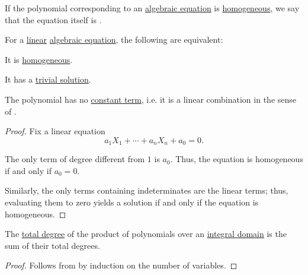 \begin{definition}\label{def:homogeneous_equation}\mimprovised
  If the polynomial corresponding to an \hyperref[def:algebraic_equation]{algebraic equation} is \hyperref[def:homogeneous_polynomial]{homogeneous}, we say that the equation itself is .
\end{definition}

\begin{proposition}\label{thm:homogeneous_linear_equation}
  For a \hyperref[def:polynomial_degree_terminology]{linear} \hyperref[def:algebraic_equation]{algebraic equation}, the following are equivalent:
  \begin{thmenum}
     It is \hyperref[def:homogeneous_equation]{homogeneous}.

     It has a \hyperref[def:trivial_solution_of_algebraic_equation]{trivial solution}.

     The polynomial has no \hyperref[def:univariate_polynomial]{constant term}, i.e. it is a linear combination in the sense of .
  \end{thmenum}
\end{proposition}
\begin{proof}
  Fix a linear equation
  \begin{equation*}
    a_1 X_1 + \cdots + a_n X_n + a_0 = 0.
  \end{equation*}

  The only term of degree different from \( 1 \) is \( a_0 \). Thus, the equation is homogeneous if and only if \( a_0 = 0 \).

  Similarly, the only terms containing indeterminates are the linear terms; thus, evaluating them to zero yields a solution if and only if the equation is homogeneous.
\end{proof}

\begin{proposition}\label{thm:degree_of_multivariate_polynomial_product}
  The \hyperref[def:polynomial_degree]{total degree} of the product of polynomials over an \hyperref[def:integral_domain]{integral domain} is the sum of their total degrees.
\end{proposition}
\begin{proof}
  Follows from  by induction on the number of variables.
\end{proof}

